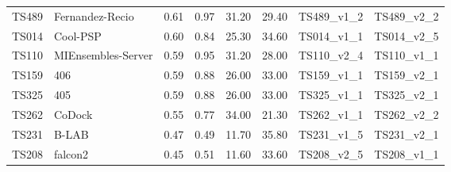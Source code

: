 \begin{table}[ht]
{\begin{tabular}{llllllll}
TS489 & Fernandez-Recio & 0.61 & 0.97 & 31.20 & 29.40 & TS489\_v1\_2 & TS489\_v2\_2 \\ 
TS014 & Cool-PSP & 0.60 & 0.84 & 25.30 & 34.60 & TS014\_v1\_1 & TS014\_v2\_5 \\ 
TS110 & MIEnsembles-Server & 0.59 & 0.95 & 31.20 & 28.00 & TS110\_v2\_4 & TS110\_v1\_1 \\ 
TS159 & 406 & 0.59 & 0.88 & 26.00 & 33.00 & TS159\_v1\_1 & TS159\_v2\_1 \\ 
TS325 & 405 & 0.59 & 0.88 & 26.00 & 33.00 & TS325\_v1\_1 & TS325\_v2\_1 \\ 
TS262 & CoDock & 0.55 & 0.77 & 34.00 & 21.30 & TS262\_v1\_1 & TS262\_v2\_2 \\ 
TS231 & B-LAB & 0.47 & 0.49 & 11.70 & 35.80 & TS231\_v1\_5 & TS231\_v2\_1 \\ 
TS208 & falcon2 & 0.45 & 0.51 & 11.60 & 33.60 & TS208\_v2\_5 & TS208\_v1\_1 \\ 
\bottomrule
\end{tabular}%
}
\end{table}
